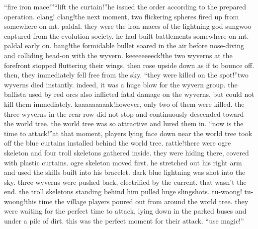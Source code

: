 “fire iron mace!”“lift the curtain!”he issued the order according to the prepared operation.
clang! clang!the next moment, two flickering spheres fired up from somewhere on mt.
 paldal.
 they were the iron maces of the lightning god sungwoo captured from the evolution society.
 he had built battlements somewhere on mt.
 paldal early on.
bang!the formidable bullet soared in the air before nose-diving and colliding head-on with the wyvern.
keeeeeeeeck!the two wyverns at the forefront stopped fluttering their wings, then rose upside down as if to bounce off.
 then, they immediately fell free from the sky.
“they were killed on the spot!”two wyverns died instantly.
 indeed, it was a huge blow for the wyvern group.
 the ballista used by red orcs also inflicted fatal damage on the wyverns, but could not kill them immediately.
kaaaaaaaaak!however, only two of them were killed.
 the three wyverns in the rear row did not stop and continuously descended toward the world tree.
 the world tree was so attractive and lured them in.
“now is the time to attack!”at that moment, players lying face down near the world tree took off the blue curtains installed behind the world tree.
rattle!there were ogre skeleton and four troll skeletons gathered inside.
 they were hiding there, covered with plastic curtains.
ogre skeleton moved first.
 he stretched out his right arm and used the skills built into his bracelet.
dark blue lightning was shot into the sky.
 three wyverns were pushed back, electrified by the current.
 that wasn’t the end.
 the troll skeletons standing behind him pulled huge slingshots.
tu-woong! tu-woong!this time the village players poured out from around the world tree.
 they were waiting for the perfect time to attack, lying down in the parked buses and under a pile of dirt.
this was the perfect moment for their attack.
“use magic!”

